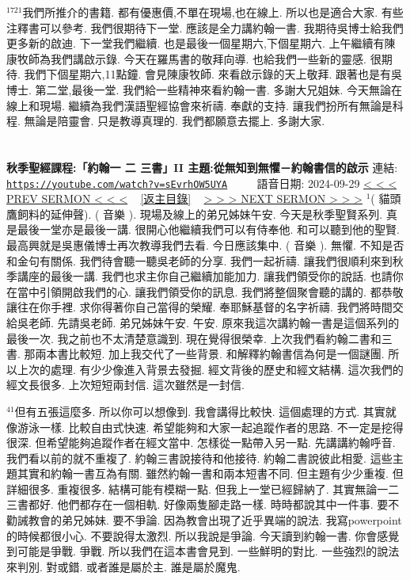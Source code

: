 \documentclass{book}
\begin{document}
$^{1721}$我們所推介的書籍.
都有優惠價,不單在現場,也在線上.
所以也是適合大家.
有些注釋書可以參考.
我們很期待下一堂.
應該是全力講約翰一書.
我期待吳博士給我們更多新的啟迪.
下一堂我們繼續.
也是最後一個星期六,下個星期六.
上午繼續有陳康牧師為我們講啟示錄.
今天在羅馬書的敬拜向導.
也給我們一些新的靈感.
很期待.
我們下個星期六,11點鐘.
會見陳康牧師.
來看啟示錄的天上敬拜.
跟著也是有吳博士.
第二堂,最後一堂.
我們給一些精神來看約翰一書.
多謝大兄姐妹.
今天無論在線上和現場.
繼續為我們漢語聖經協會來祈禱.
奉獻的支持.
讓我們扮所有無論是科程.
無論是陪靈會.
只是教導真理的.
我們都願意去擺上.
多謝大家.
\newpage



\section{}
\label{sec:sEvrhOW5UYA}
\textbf{秋季聖經課程:「約翰一 二 三書」II 主題:從無知到無懼－約翰書信的啟示}
\newline
\newline
連結: \href{https://youtube.com/watch?v=sEvrhOW5UYA}{\texttt{https://youtube.com/watch?v=sEvrhOW5UYA}} ~~~~ 語音日期: 2024-09-29
\newline
\newline
\hyperref[sec:x3lU8yQeNU8]{\small{< < < PREV SERMON < < <}}
~
\hyperref[sec:index]{\small{[返主目錄]}}
~
\hyperref[sec:I0XYkK_j_N0]{\small{> > > NEXT SERMON > > >}}
\newline
\newline
$^{1}$( 貓頭鷹飼料的延伸聲).
( 音樂 ).
現場及線上的弟兄姊妹午安.
今天是秋季聖賢系列.
真是最後一堂亦是最後一講.
很開心他繼續我們可以有侍奉他.
和可以聽到他的聖賢.
最高興就是吳惠儀博士再次教導我們去看.
今日應該集中.
( 音樂 ).
無懼.
不知是否和金句有關係.
我們待會聽一聽吳老師的分享.
我們一起祈禱.
讓我們很順利來到秋季講座的最後一講.
我們也求主你自己繼續加能加力.
讓我們領受你的說話.
也請你在當中引領開啟我們的心.
讓我們領受你的訊息.
我們將整個聚會聽的講的.
都恭敬讓往在你手裡.
求你得著你自己當得的榮耀.
奉耶穌基督的名字祈禱.
我們將時間交給吳老師.
先請吳老師.
弟兄姊妹午安.
午安.
原來我這次講約翰一書是這個系列的最後一次.
我之前也不太清楚意識到.
現在覺得很榮幸.
上次我們看約翰二書和三書.
那兩本書比較短.
加上我交代了一些背景.
和解釋約翰書信為何是一個謎團.
所以上次的處理.
有少少像進入背景去發掘.
經文背後的歷史和經文結構.
這次我們的經文長很多.
上次短短兩封信.
這次雖然是一封信.

$^{41}$但有五張這麼多.
所以你可以想像到.
我會講得比較快.
這個處理的方式.
其實就像游泳一樣.
比較自由式快速.
希望能夠和大家一起追蹤作者的思路.
不一定是挖得很深.
但希望能夠追蹤作者在經文當中.
怎樣從一點帶入另一點.
先講講約翰呼音.
我們看以前的就不重複了.
約翰三書說接待和他接待.
約翰二書說彼此相愛.
這些主題其實和約翰一書互為有關.
雖然約翰一書和兩本短書不同.
但主題有少少重複.
但詳細很多.
重複很多.
結構可能有模糊一點.
但我上一堂已經歸納了.
其實無論一二三書都好.
他們都存在一個相軌.
好像兩隻腳走路一樣.
時時都說其中一件事.
要不勸誡教會的弟兄姊妹.
要不爭論.
因為教會出現了近乎異端的說法.
我寫powerpoint的時候都很小心.
不要說得太激烈.
所以我說是爭論.
今天讀到約翰一書.
你會感覺到可能是爭戰.
爭戰.
所以我們在這本書會見到.
一些鮮明的對比.
一些強烈的說法來判別.
對或錯.
或者誰是屬於主.
誰是屬於魔鬼.
\end{document}
